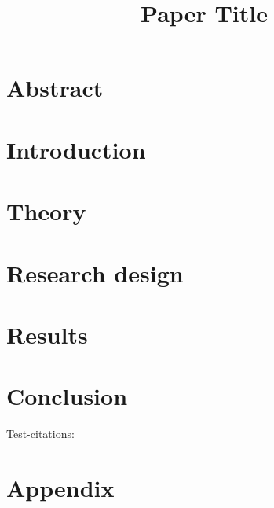 \documentclass[12pt]{article} %
\title{Paper Title}
\begin{document}
\tartitlepage

\tarfirstpagetitle %
\vspace{-1em}
\section*{Abstract}
\lipsum[1-6][1-20]

\section{Introduction}
\lipsum[1-4]

\section{Theory}
\lipsum[4-5]

\section{Research design}
\lipsum[5-6]

\section{Results}
\lipsum[6-9]

\section{Conclusion}
\lipsum[9]

Test-citations: \textcite{Gallani2019BudgetingMisreporting} \parencite{Matejka2017BalancingEvidence, Valchev2023BiasedSurveys}


\newpage
\FloatBarrier
{ \printbibliography}
\newpage

\section*{Appendix}
\end{document}
